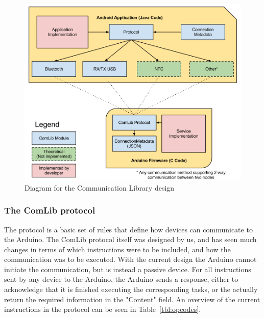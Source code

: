 \begin{figure}[h!]
	\centering \includegraphics[scale=0.4]{img/comlib-diagram.png}
	\caption{Diagram for the Communication Library design}
	\label{fig:comlib-diagram}
\end{figure}

\subsubsection{The ComLib protocol}
The protocol is a basic set of rules that define how devices can communicate to the Arduino.
The ComLib protocol itself was designed by us, and has seen much changes in terms of which instructions were to be included,
and how the communication was to be executed. With the current design the Arduino cannot initiate the communication,
but is instead a passive device. For all instructions sent by any device to the Arduino, the Arduino sends a response,
either to acknowledge that it is finished executing the corresponding tasks, or the actually return the required
information in the "Content" field. An overview of the current instructions in the protocol can be seen in Table~\ref{tbl:opcodes}.


